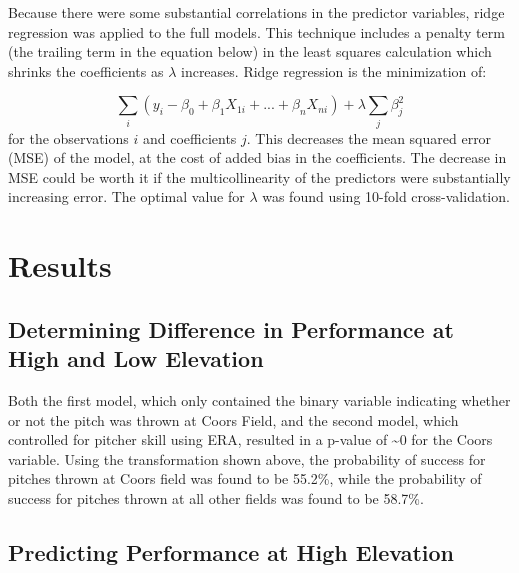 \documentclass{article}
\begin{document}
Because there were some substantial correlations in the predictor variables, ridge regression was applied to the full models. This technique includes a penalty term (the trailing term in the equation below) in the least squares calculation which shrinks the coefficients as \(\lambda\) increases. Ridge regression is the minimization of:

\[\sum_{i} (y_i - \beta_0 + \beta_1 X_{1i} + ... + \beta_n X_{ni}) + \lambda \sum_{j} \beta_j^2\]
for the observations \(i\) and coefficients \(j\). This decreases the mean squared error (MSE) of the model, at the cost of added bias in the coefficients. The decrease in MSE could be worth it if the multicollinearity of the predictors were substantially increasing error. The optimal value for \(\lambda\) was found using 10-fold cross-validation. 

\section{Results}

\subsection{Determining Difference in Performance at High and Low Elevation}

Both the first model, which only contained the binary variable indicating whether or not the pitch was thrown at Coors Field, and the second model, which controlled for pitcher skill using ERA, resulted in a p-value of \textasciitilde 0 for the Coors variable. Using the transformation shown above, the probability of success for pitches thrown at Coors field was found to be 55.2\%, while the probability of success for pitches thrown at all other fields was found to be 58.7\%. 


\subsection{Predicting Performance at High Elevation}
\end{document}
